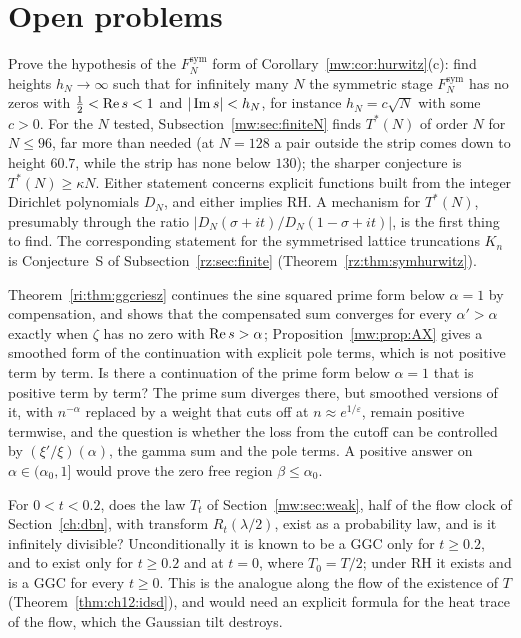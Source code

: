 \section{Open problems}\label{mw:sec:open}

\begin{problem}\label{mw:prob:hurwitz}
Prove the hypothesis of the $F_N^{\mathrm{sym}}$ form of Corollary~\ref{mw:cor:hurwitz}(c): find heights $h_N\to\infty$ such that for infinitely many $N$ the symmetric stage $F^{\mathrm{sym}}_N$ has no zeros with $\tfrac12<\operatorname{Re} s<1$ and $|\operatorname{Im} s|<h_N$, for instance $h_N=c\sqrt N$ with some $c>0$. For the $N$ tested, Subsection~\ref{mw:sec:finiteN} finds $T^*(N)$ of order $N$ for $N\le96$, far more than needed (at $N=128$ a pair outside the strip comes down to height $60.7$, while the strip has none below $130$); the sharper conjecture is $T^*(N)\geq\kappa N$. Either statement concerns explicit functions built from the integer Dirichlet polynomials $D_N$, and either implies RH. A mechanism for $T^*(N)$, presumably through the ratio $|D_N(\sigma+it)/D_N(1-\sigma+it)|$, is the first thing to find. The corresponding statement for the symmetrised lattice truncations $K_n$ is Conjecture~S of Subsection~\ref{rz:sec:finite} (Theorem~\ref{rz:thm:symhurwitz}).
\end{problem}

\begin{problem}\label{mw:prob:lagarias}
Theorem~\ref{ri:thm:ggcriesz} continues the sine squared prime form below $\alpha=1$ by compensation, and shows that the compensated sum converges for every $\alpha'>\alpha$ exactly when $\zeta$ has no zero with $\operatorname{Re} s>\alpha$; Proposition~\ref{mw:prop:AX} gives a smoothed form of the continuation with explicit pole terms, which is not positive term by term. Is there a continuation of the prime form below $\alpha=1$ that is positive term by term? The prime sum diverges there, but smoothed versions of it, with $n^{-\alpha}$ replaced by a weight that cuts off at $n\approx e^{1/\varepsilon}$, remain positive termwise, and the question is whether the loss from the cutoff can be controlled by $(\xi'/\xi)(\alpha)$, the gamma sum and the pole terms. A positive answer on $\alpha\in(\alpha_0,1]$ would prove the zero free region $\beta\leq\alpha_0$.
\end{problem}

\begin{problem}\label{mw:prob:flow}
For $0<t<0.2$, does the law $T_t$ of Section~\ref{mw:sec:weak}, half of the flow clock of Section~\ref{ch:dbn}, with transform $R_t(\lambda/2)$, exist as a probability law, and is it infinitely divisible? Unconditionally it is known to be a GGC only for $t\geq0.2$, and to exist only for $t\geq0.2$ and at $t=0$, where $T_0=T/2$; under RH it exists and is a GGC for every $t\geq0$. This is the analogue along the flow of the existence of $T$ (Theorem~\ref{thm:ch12:idsd}), and would need an explicit formula for the heat trace of the flow, which the Gaussian tilt destroys.
\end{problem}

